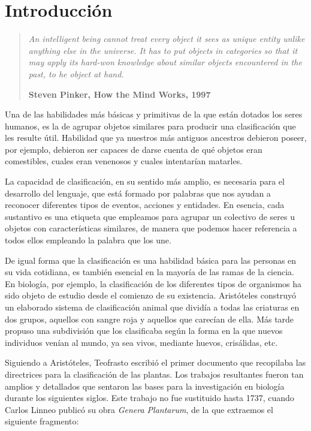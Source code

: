
\chapter{Introducción}\label{ch:introduccion}

\begin{quotation}{\slshape
		An intelligent being cannot treat every object it sees as unique entity unlike anything else in the universe. It has to put objects in categories so that it may apply its hard-won knowledge about similar objects encountered in the past, to he object at hand.}
		\begin{flushright}
			\textbf{Steven Pinker, How the Mind Works, 1997} 
		\end{flushright}
\end{quotation}

Una de las habilidades más básicas y primitivas de la que están dotados los seres humanos, es la de agrupar objetos similares para producir una clasificación que les resulte útil. Habilidad que ya nuestros más antiguos ancestros debieron poseer, por ejemplo, debieron ser capaces de darse cuenta de qué objetos eran comestibles, cuales eran venenosos y cuales intentarían matarles.

La capacidad de clasificación, en su sentido más amplio, es necesaria para el desarrollo del lenguaje, que está formado por palabras que nos ayudan a reconocer diferentes tipos de eventos, acciones y entidades. En esencia, cada sustantivo es una etiqueta que empleamos para agrupar un colectivo de seres u objetos con características similares, de manera que podemos hacer referencia a todos ellos empleando la palabra que los une.

De igual forma que la clasificación es una habilidad básica para las personas en su vida cotidiana, es también esencial en la mayoría de las ramas de la ciencia. En biología, por ejemplo, la clasificación de los diferentes tipos de organismos ha sido objeto de estudio desde el comienzo de su existencia. Aristóteles construyó un elaborado sistema de clasificación animal que dividía a todas las criaturas en dos grupos, aquellos con sangre roja y aquellos que carecían de ella. Más tarde propuso una subdivisión que los clasificaba según la forma en la que nuevos individuos venían al mundo, ya sea vivos, mediante huevos, crisálidas, etc.

Siguiendo a Aristóteles, Teofrasto escribió el primer documento que recopilaba las directrices para la clasificación de las plantas. Los trabajos resultantes fueron tan amplios y detallados que sentaron las bases para la investigación en biología durante los siguientes siglos. Este trabajo no fue sustituido hasta 1737, cuando Carlos Linneo publicó su obra \textit{Genera Plantarum}, de la que extraemos el siguiente fragmento:

